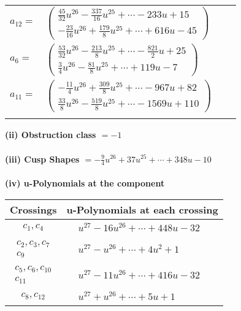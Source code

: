 \documentclass[1p]{elsarticle_modified}
\theoremstyle{definition}
\begin{document}
\begin{tabular}{m{7pt} m{180pt} m{7pt} m{180pt} }
\flushright $a_{12}=$&$\begin{pmatrix}\frac{45}{32} u^{26}-\frac{337}{16} u^{25}+\cdots-233 u+15\\-\frac{23}{16} u^{26}+\frac{179}{8} u^{25}+\cdots+616 u-45\end{pmatrix}$ \\
\flushright $a_{6}=$&$\begin{pmatrix}\frac{53}{32} u^{26}-\frac{213}{8} u^{25}+\cdots-\frac{821}{2} u+25\\\frac{3}{4} u^{26}-\frac{81}{8} u^{25}+\cdots+119 u-7\end{pmatrix}$ \\
\flushright $a_{11}=$&$\begin{pmatrix}-\frac{11}{4} u^{26}+\frac{309}{8} u^{25}+\cdots-967 u+82\\\frac{33}{8} u^{26}-\frac{519}{8} u^{25}+\cdots-1569 u+110\end{pmatrix}$\\&\end{tabular}
\flushleft \textbf{(ii) Obstruction class $= -1$}\\~\\
\flushleft \textbf{(iii) Cusp Shapes $= -\frac{9}{4} u^{26}+37 u^{25}+\cdots+348 u-10$}\\~\\
\newpage\renewcommand{\arraystretch}{1}
\flushleft \textbf{(iv) u-Polynomials at the component}\newline \\
\begin{tabular}{m{50pt}|m{274pt}}
Crossings & \hspace{64pt}u-Polynomials at each crossing \\
\hline $$\begin{aligned}c_{1},c_{4}\end{aligned}$$&$\begin{aligned}
&u^{27}-16 u^{26}+\cdots+448 u-32
\end{aligned}$\\
\hline $$\begin{aligned}c_{2},c_{3},c_{7}\\c_{9}\end{aligned}$$&$\begin{aligned}
&u^{27}- u^{26}+\cdots+4 u^2+1
\end{aligned}$\\
\hline $$\begin{aligned}c_{5},c_{6},c_{10}\\c_{11}\end{aligned}$$&$\begin{aligned}
&u^{27}-11 u^{26}+\cdots+416 u-32
\end{aligned}$\\
\hline $$\begin{aligned}c_{8},c_{12}\end{aligned}$$&$\begin{aligned}
&u^{27}+u^{26}+\cdots+5 u+1
\end{aligned}$\\
\hline
\end{tabular}\\~\\
\end{document}
